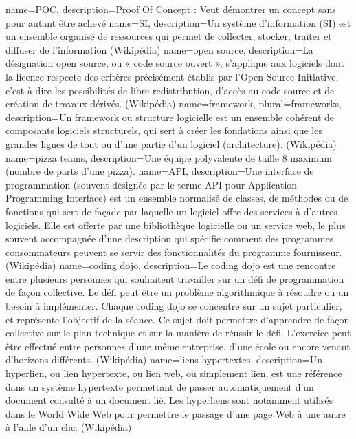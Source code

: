 {
  name=POC,
  description={Proof Of Concept : Veut démontrer un concept sans pour autant être achevé}
}
{
    name=SI,
    description={Un système d'information (SI) est un ensemble organisé de ressources qui permet de collecter, stocker, traiter et diffuser de l'information (Wikipédia)}
}
{
  name=open source,
  description={La désignation open source, ou « code source ouvert », s'applique aux logiciels dont la licence respecte des critères précisément établis par l'Open Source Initiative, c'est-à-dire les possibilités de libre redistribution, d'accès au code source et de création de travaux dérivés. (Wikipédia)}
}
{
  name=framework,
  plural=frameworks,
  description={Un framework ou structure logicielle est un ensemble cohérent de composants logiciels structurels, qui sert à créer les fondations ainsi que les grandes lignes de tout ou d’une partie d'un logiciel (architecture). (Wikipédia)}
}
{
  name=pizza teams,
  description={Une équipe polyvalente de taille 8 maximum (nombre de parts d'une pizza).}
}
{
  name=API,
  description={Une interface de programmation (souvent désignée par le terme API pour Application Programming Interface) est un ensemble normalisé de classes, de méthodes ou de fonctions qui sert de façade par laquelle un logiciel offre des services à d'autres logiciels. Elle est offerte par une bibliothèque logicielle ou un service web, le plus souvent accompagnée d'une description qui spécifie comment des programmes consommateurs peuvent se servir des fonctionnalités du programme fournisseur. (Wikipédia)}
}
{
  name=coding dojo,
  description={Le coding dojo est une rencontre entre plusieurs personnes qui souhaitent travailler sur un défi de programmation de façon collective. Le défi peut être un problème algorithmique à résoudre ou un besoin à implémenter. Chaque coding dojo se concentre sur un sujet particulier, et représente l'objectif de la séance. Ce sujet doit permettre d'apprendre de façon collective sur le plan technique et sur la manière de réussir le défi. L'exercice peut être effectué entre personnes d'une même entreprise, d'une école ou encore venant d'horizons différents. (Wikipédia)}
}
{
  name=liens hypertextes,
  description={Un hyperlien, ou lien hypertexte, ou lien web, ou simplement lien, est une référence dans un système hypertexte permettant de passer automatiquement d'un document consulté à un document lié. Les hyperliens sont notamment utilisés dans le World Wide Web pour permettre le passage d'une page Web à une autre à l'aide d'un clic. (Wikipédia)}
}
